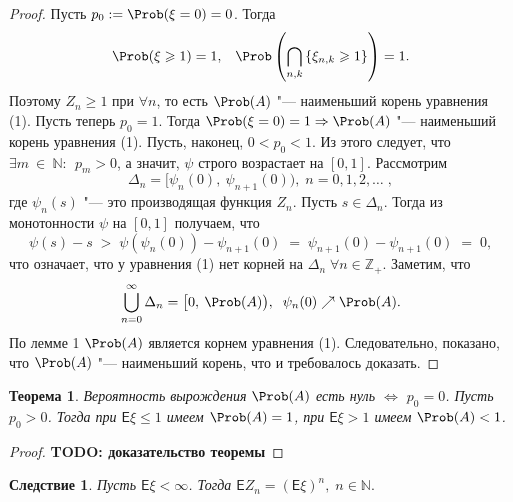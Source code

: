 \documentclass[a4paper]{article}
\newcommand{\Expect}{\mathsf{E}}
\theoremstyle{plain}
\newtheorem{thm}{Теорема}[section]
\newtheorem*{cor}{Следствие}
\theoremstyle{definition}
\theoremstyle{remark}
\begin{document}
\begin{proof}
  Пусть $p_{0} := \Prob(\xi = 0) = 0$. Тогда
  \begin{equation*}
    \Prob(\xi \geqslant 1) = 1{,}\quad \Prob\left(\bigcap\limits_{n,k} \left\lbrace \xi_{n,k} \geqslant 1 \right\rbrace \right) = 1{.}
  \end{equation*}
  Поэтому $Z_{n} \geqslant 1$ при $\forall n$, то есть $\Prob(A)$ "--- наименьший корень уравнения (1).
  Пусть теперь $p_{0} = 1$. Тогда $\Prob(\xi = 0)=1 \Rightarrow \Prob(A)$ "--- наименьший корень уравнения (1).
  Пусть, наконец, $0 < p_{0} < 1$. Из этого следует, что $\exists m~\in~\mathbb{N}{:}\;\, p_{m} > 0$, а значит, $\psi$ строго возрастает на $[0, 1]$. Рассмотрим
  \begin{equation*}
    \Delta_{n} = \big[\psi_{n}(0),\: \psi_{n+1}\left(0\right)\big){,}\; n = 0, 1, 2, \ldots \; {,} %
  \end{equation*}
  где $\psi_{n}(s)$ "--- это производящая функция $Z_{n}$. Пусть $s \in \Delta_{n}$. Тогда из монотонности $\psi$ на $[0, 1]$ получаем, что
  \begin{equation*}
    \psi(s) - s \; > \; \psi(\psi_{n}(0)) - \psi_{n+1}(0) \; = \; \psi_{n+1}(0) - \psi_{n+1}(0) \; = \; 0{,}
  \end{equation*}
  что означает, что у уравнения (1) нет корней на $\Delta_{n} \; \forall n \in \mathbb{Z_{+}}$.
  Заметим, что
  \begin{equation*}
    \bigcup\limits_{n=0}^{\infty} \Delta_{n} = \big[0,\: \Prob(A)\big), \; \; \psi_{n}(0) \nearrow \Prob(A){.} %
  \end{equation*}
  По лемме 1 $\Prob(A)$ является корнем уравнения (1). Следовательно, показано, что $\Prob(A)$ "--- наименьший корень, что и требовалось доказать.
\end{proof}

\begin{thm}
  Вероятность вырождения $\Prob(A)$ есть нуль $\Leftrightarrow$ $p_{0} = 0$. Пусть $p_{0} > 0$. Тогда при $\Expect \xi \leqslant 1$ имеем $\Prob (A) = 1$, при $\Expect \xi > 1$ имеем $\Prob(A) < 1$.
\end{thm}

\begin{proof}
  \textbf{TODO: доказательство теоремы}
\end{proof}

\begin{cor}
  Пусть $\Expect \xi < \infty$. Тогда $\Expect Z_{n} = (\Expect \xi)^{n},\; n \in \mathbb{N}{.}$
\end{cor}
\end{document}
